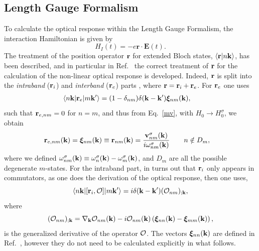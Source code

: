 \documentclass[floatfix,prb,aps,superscriptaddress,11pt,preprint,letterpaper]{revtex4}
\begin{document}
\subsection{Length Gauge Formalism}
To calculate the optical response 
within the Length Gauge Formalism, the interaction Hamiltonian is given by 
\begin{equation}
H_{I}(t)=-e\mathbf{r}\cdot \mathbf{E}(t).  \label{rde}
\end{equation}
The 
treatment of the position operator
$\mathbf{r}$ for extended Bloch states, $\langle {\mathbf{r}} | {n\mathbf{k}} \rangle$, has been
described,\cite{adamsJCP53,blountSSP62} and in particular 
in Ref.~ the correct treatment of $\mathbf{r}$ for
the calculation of the non-linear optical response is
developed. Indeed, 
 $\mathbf{r}$ is split into the {\it intraband} 
($\mathbf{r}_i$) and {\it interband} ($\mathbf{r}_e$) parts , where 
$\mathbf{r}=\mathbf{r}_i+\mathbf{r}_e$. 
For $\mathbf{r}_e$ one uses
\begin{align}\label{rnminn}
\langle n\mathbf{k} |\mathbf{r}_e| m\mathbf{k}' \rangle &=
(1-\delta_{nm})\delta(\mathbf{k}-\mathbf{k}')\boldsymbol{\xi}_{nm}(\mathbf{k}) 
,
\end{align}
such that $\mathbf{r}_{e,nm}=0$ for $n=m$, and thus
from Eq.~\eqref{mv}, with $H_0\to
H^\sigma_0$, we obtain
\begin{align}\label{pmnrmn}
\mathbf{r}_{e,nm}(\mathbf{k}) =
\boldsymbol{\xi}_{nm}(\mathbf{k})\equiv 
\mathbf{r}_{nm}(\mathbf{k}) 
&=
\frac{\mathbf{v}^\sigma_{nm}(\mathbf{k})}{i\omega^\sigma_{nm}(\mathbf{k})}
\quad\quad n\notin D_m 
,
\end{align}  
where we defined
$\omega^\sigma_{nm}(\mathbf{k})\equiv\omega^\sigma_n(\mathbf{k})-\omega^\sigma_m(\mathbf{k})$, and
$D_m$ are all the possible degenerate $m$-states. 
For the intraband part, in turns out that $\mathbf{r}_i$ only appears in
commutators, as one does the derivation of
the optical response, then one uses,\cite{aversaPRB95}
\begin{equation}\label{conmri3n}
\langle n\mathbf{k} |[\mathbf{r}_i,{\cal O}]| m\mathbf{k}' \rangle
=i\delta(\mathbf{k}-\mathbf{k}')({\cal O}_{nm})_{;\mathbf{k}}
,
\end{equation}  
where
\begin{equation}\label{gendevnn}
({\cal O}_{nm})_{;\mathbf{k}}=
\nabla_{\mathbf{k}} 
{\cal O}_{n m}(\mathbf{k}) 
- 
i 
{\cal O}_{nm}(\mathbf{k}) 
\left(
\boldsymbol{\xi}_{nn}(\mathbf{k}) 
-
\boldsymbol{\xi}_{mm}(\mathbf{k}) 
\right) 
,
\end{equation} 
is
the generalized derivative 
of the operator ${\cal O}$. 
The vectors $\boldsymbol{\xi}_{nn}(\mathbf{k})$ are defined in 
Ref.~, however they do not need to be 
calculated explicitly in what follows. 
\end{document}
